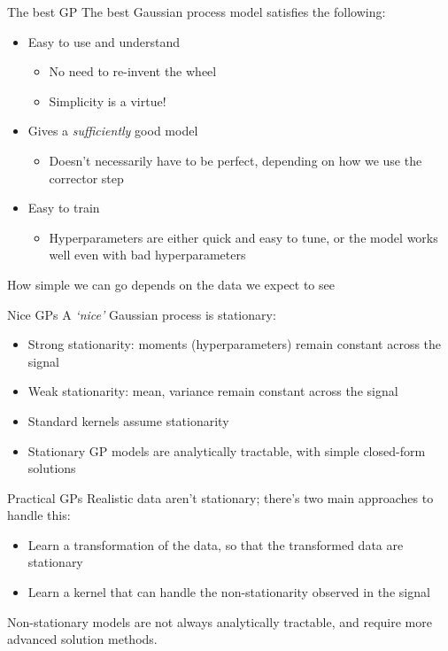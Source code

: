 \documentclass[presentation]{beamer}
\begin{document}
\begin{frame}[label={sec:orgeb4d41c}]{The best GP}
The best Gaussian process model satisfies the following:

\vfill

\begin{itemize}
\item Easy to use and understand
\begin{itemize}
\item No need to re-invent the wheel
\item Simplicity is a virtue!
\end{itemize}
\item Gives a \emph{sufficiently} good model
\begin{itemize}
\item Doesn't necessarily have to be perfect, depending on how we use the corrector step
\end{itemize}
\item Easy to train
\begin{itemize}
\item Hyperparameters are either quick and easy to tune, or the model works well even with bad hyperparameters
\end{itemize}
\end{itemize}

\vfill

How simple we can go depends on the data we expect to see
\end{frame}

\begin{frame}[label={sec:org367854f}]{Nice GPs}
A \emph{`nice'} Gaussian process is stationary:

\vfill

\begin{itemize}
\item Strong stationarity: moments (hyperparameters) remain constant across the signal
\item Weak stationarity: mean, variance remain constant across the signal
\item Standard kernels assume stationarity
\item Stationary GP models are analytically tractable, with simple closed-form solutions
\end{itemize}

\vfill
\end{frame}

\begin{frame}[label={sec:org34070bc}]{Practical GPs}
Realistic data aren't stationary; there's two main approaches to handle this:

\vfill

\begin{itemize}
\item Learn a transformation of the data, so that the transformed data are stationary
\item Learn a kernel that can handle the non-stationarity observed in the signal
\end{itemize}

\vfill

Non-stationary models are not always analytically tractable, and require more advanced solution methods.
\end{frame}
\end{document}
